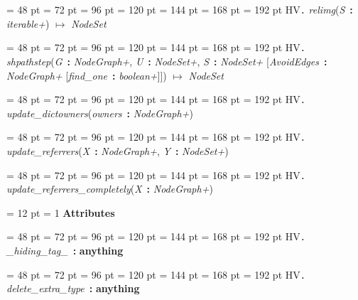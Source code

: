 {{{{\par \noindent  \leftskip = 48 pt  \leftmargini = 72 pt  \leftmarginii = 96 pt  \leftmarginiii = 120 pt  \leftmarginiv = 144 pt  \leftmarginv = 168 pt  \leftmarginvi = 192 pt HV{\large {\tt .\/} {\em relimg\/}}({\em S\/}~{\bf :}  {\em iterable+\/}) \(\mapsto \)  {\em NodeSet\/}\par}
{\par \noindent  \leftskip = 48 pt  \leftmargini = 72 pt  \leftmarginii = 96 pt  \leftmarginiii = 120 pt  \leftmarginiv = 144 pt  \leftmarginv = 168 pt  \leftmarginvi = 192 pt HV{\large {\tt .\/} {\em shpathstep\/}}({\em G\/}~{\bf :}  {\em NodeGraph+\/}, {\em U\/}~{\bf :}  {\em NodeSet+\/}, {\em S\/}~{\bf :}  {\em NodeSet+\/}  {[}{\em AvoidEdges\/}~{\bf :}  {\em NodeGraph+\/}  {[}{\em find{\_}one\/}~{\bf :}  {\em boolean+\/}]]) \(\mapsto \)  {\em NodeSet\/}\par}
{\par \noindent  \leftskip = 48 pt  \leftmargini = 72 pt  \leftmarginii = 96 pt  \leftmarginiii = 120 pt  \leftmarginiv = 144 pt  \leftmarginv = 168 pt  \leftmarginvi = 192 pt HV{\large {\tt .\/} {\em update{\_}dictowners\/}}({\em owners\/}~{\bf :}  {\em NodeGraph+\/})\par}
{\par \noindent  \leftskip = 48 pt  \leftmargini = 72 pt  \leftmarginii = 96 pt  \leftmarginiii = 120 pt  \leftmarginiv = 144 pt  \leftmarginv = 168 pt  \leftmarginvi = 192 pt HV{\large {\tt .\/} {\em update{\_}referrers\/}}({\em X\/}~{\bf :}  {\em NodeGraph+\/}, {\em Y\/}~{\bf :}  {\em NodeSet+\/})\par}
{\par \noindent  \leftskip = 48 pt  \leftmargini = 72 pt  \leftmarginii = 96 pt  \leftmarginiii = 120 pt  \leftmarginiv = 144 pt  \leftmarginv = 168 pt  \leftmarginvi = 192 pt HV{\large {\tt .\/} {\em update{\_}referrers{\_}completely\/}}({\em X\/}~{\bf :}  {\em NodeGraph+\/})\par}
{\par \pagebreak[3.200000] \noindent \hangindent = 12 pt \hangafter = 1 
{\bf {\large {\bf Attributes\/}}\/}\par}
{\par \noindent  \leftskip = 48 pt  \leftmargini = 72 pt  \leftmarginii = 96 pt  \leftmarginiii = 120 pt  \leftmarginiv = 144 pt  \leftmarginv = 168 pt  \leftmarginvi = 192 pt HV{\large {\tt .\/} {\em {\_}hiding{\_}tag{\_}\/}}~{\bf :} {\bf  anything\/}\par}
{\par \noindent  \leftskip = 48 pt  \leftmargini = 72 pt  \leftmarginii = 96 pt  \leftmarginiii = 120 pt  \leftmarginiv = 144 pt  \leftmarginv = 168 pt  \leftmarginvi = 192 pt HV{\large {\tt .\/} {\em delete{\_}extra{\_}type\/}}~{\bf :} {\bf  anything\/}\par}
}}}
